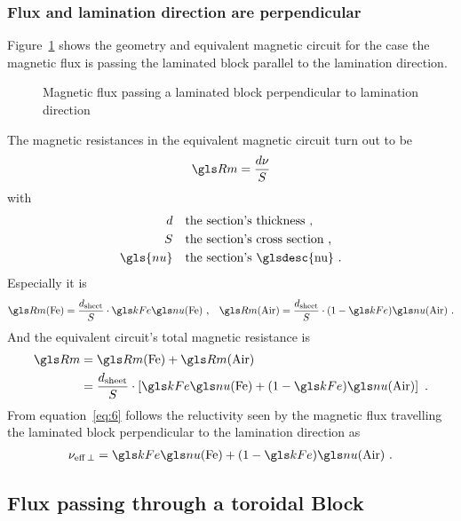 \subsubsection{Flux and lamination direction are perpendicular}
\label{sec:perp-lamin-direct}

Figure~\ref{fig:Lam-Mat-Flux-perpendicular} shows the geometry and
equivalent magnetic circuit for the case the magnetic flux is passing
the laminated block parallel to the lamination direction.
\begin{figure}
  \centering
  \subfloat[Geometry]{
    }
  \hfil
  \caption{Magnetic flux passing a laminated block perpendicular to lamination direction}
  \label{fig:Lam-Mat-Flux-perpendicular}
\end{figure}
The magnetic resistances in the equivalent magnetic circuit turn out to be
\begin{gather}
  \label{eq:25}
  \Rm=\frac{d\nu}{S}
\end{gather}
with
\begin{align*}
  d&\quad\text{the section's thickness}\text{~,}\\
  S&\quad\text{the section's cross section}\text{~,}\\
  \gls{nu}&\quad\text{the section's \glsdesc{nu}}\text{~.}
\end{align*}
Especially it is
\begin{align}
  \RmFe=\frac{\dsheet}{S}\cdot\kFe\nuFe\text{~,} &&
  \RmAir=\frac{\dsheet}{S}\cdot(1-\kFe)\nuAir\text{~.}
\end{align}
And the equivalent circuit's total magnetic resistance is
\begin{gather}
  \label{eq:6}
  \begin{split}
    \Rm&=\RmFe + \RmAir \\
    &=\frac{\dsheet}{S}\cdot\left[\kFe\nuFe+(1-\kFe)\nuAir\right]\text{~.}
  \end{split}
\end{gather}
From equation~\eqref{eq:6} follows the reluctivity seen by the
magnetic flux travelling the laminated block perpendicular to the
lamination direction as
\begin{gather}
  \nueffperp= \kFe\nuFe+(1-\kFe)\nuAir \text{~.}
\end{gather}


\subsection{Flux passing through a toroidal Block}
\label{sec:cylinder-coordinates}

